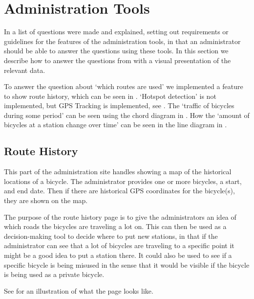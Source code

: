 \section{Administration Tools}\label{sec:impAdminTools}
In  a list of questions were made and explained, setting out requirements or guidelines for the features of the administration tools, in that an administrator should be able to answer the questions using these tools. 
In this section we describe how to answer the questions from  with a visual presentation of the relevant data.

To answer the question about `which routes are used' we implemented a feature to show route history, which can be seen in .
`Hotspot detection' is not implemented, but GPS Tracking is implemented, see .
The `traffic of bicycles during some period' can be seen using the chord diagram in .
How the `amount of bicycles at a station change over time' can be seen in the line diagram in  .

\subsection{Route History}\label{sec:routeHistory}
This part of the administration site handles showing a map of the historical locations of a bicycle.
The administrator provides one or more bicycles, a start, and end date.
Then if there are historical GPS coordinates for the bicycle(s), they are shown on the map. 

The purpose of the route history page is to give the administrators an idea of which roads the bicycles are traveling a lot on. 
This can then be used as a decision-making tool to decide where to put new stations, in that if the administrator can see that a lot of bicycles are traveling to a specific point it might be a good idea to put a station there.
It could also be used to see if a specific bicycle is being misused in the sense that it would be visible if the bicycle is being used as a private bicycle.

See  for an illustration of what the page looks like.


